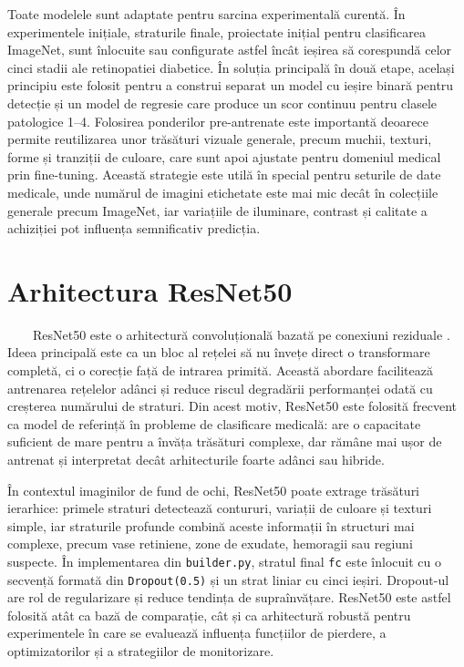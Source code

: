 \documentclass[12pt, a4paper, twoside, romanian]{teza-upb}
\begin{document}
Toate modelele sunt adaptate pentru sarcina experimentală curentă. În experimentele inițiale,
straturile finale, proiectate inițial pentru clasificarea ImageNet, sunt înlocuite sau configurate
astfel încât ieșirea să corespundă celor cinci stadii ale retinopatiei diabetice. În soluția
principală în două etape, același principiu este folosit pentru a construi separat un model cu
ieșire binară pentru detecție și un model de regresie care produce un scor continuu pentru
clasele patologice 1--4.
Folosirea ponderilor pre-antrenate este importantă deoarece permite
reutilizarea unor trăsături vizuale generale, precum muchii, texturi, forme și tranziții de culoare,
care sunt apoi ajustate pentru domeniul medical prin fine-tuning. Această strategie este utilă
în special pentru seturile de date medicale, unde numărul de imagini etichetate este mai
mic decât în colecțiile generale precum ImageNet, iar variațiile de iluminare, contrast și
calitate a achiziției pot influența semnificativ predicția.

\section{Arhitectura ResNet50}

\ \ \ \ ResNet50 este o arhitectură convoluțională bazată pe conexiuni reziduale \cite{21_he2016deep}. Ideea principală
este ca un bloc al rețelei să nu învețe direct o transformare
completă, ci o corecție față de intrarea primită. Această abordare facilitează antrenarea
rețelelor adânci și reduce riscul degradării performanței odată cu creșterea numărului de
straturi. Din acest motiv, ResNet50 este folosită frecvent ca model de referință în
probleme de clasificare medicală: are o capacitate suficient de mare pentru a învăța
trăsături complexe, dar rămâne mai ușor de antrenat și interpretat decât arhitecturile
foarte adânci sau hibride.
\bigskip

În contextul imaginilor de fund de ochi, ResNet50 poate extrage trăsături ierarhice:
primele straturi detectează contururi, variații de culoare și texturi simple, iar straturile
profunde combină aceste informații în structuri mai complexe, precum vase retiniene, zone
de exudate, hemoragii sau regiuni suspecte. În implementarea din \texttt{builder.py}, stratul final
\texttt{fc} este înlocuit cu o secvență formată din \texttt{Dropout(0.5)} și un strat
liniar cu cinci ieșiri. Dropout-ul are rol de regularizare și reduce tendința
de supraînvățare. ResNet50 este astfel folosită atât ca bază de comparație, cât și
ca arhitectură robustă pentru experimentele în care se evaluează influența funcțiilor de
pierdere, a optimizatorilor și a strategiilor de monitorizare.
\end{document}
